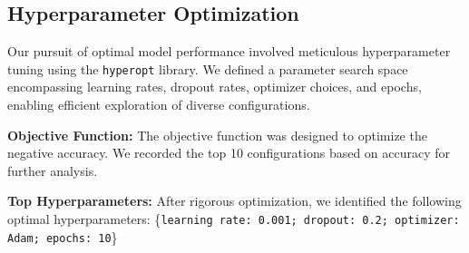 \subsection{Hyperparameter Optimization}
\vspace{-1em}
Our pursuit of optimal model performance involved meticulous hyperparameter tuning using the \texttt{hyperopt} library. We defined a parameter search space encompassing learning rates, dropout rates, optimizer choices, and epochs, enabling efficient exploration of diverse configurations.

\textbf{Objective Function:} The objective function was designed to optimize the negative accuracy. We recorded the top 10 configurations based on accuracy for further analysis.

\textbf{Top Hyperparameters:} After rigorous optimization, we identified the following optimal hyperparameters: \{\texttt{learning rate: 0.001; dropout: 0.2; optimizer: Adam; epochs: 10}\}

